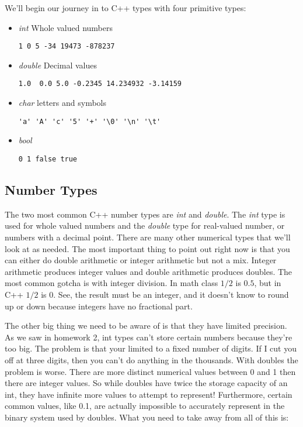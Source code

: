 \documentclass[]{tufte-handout}
\begin{document}
We'll begin our journey in to C++ types with four primitive types:
\begin{itemize}
\item \textit{int} Whole valued numbers
\begin{verbatim}
1 0 5 -34 19473 -878237
\end{verbatim}
\item \textit{double} Decimal values
\begin{verbatim}
1.0  0.0 5.0 -0.2345 14.234932 -3.14159
\end{verbatim}
\item \textit{char} letters and symbols
\begin{verbatim}
'a' 'A' 'c' '5' '+' '\0' '\n' '\t'
\end{verbatim}
\item \textit{bool}
\begin{verbatim}
0 1 false true
\end{verbatim}
\end{itemize}

\subsection{Number Types}

The two most common C++ number types are \textit{int} and \textit{double}. The \textit{int} type is used for whole valued numbers and the \textit{double} type for real-valued number, or numbers with a decimal point. There are many other numerical types that we'll look at as needed. The most important thing to point out right now is that you can either do double arithmetic or integer arithmetic but not a mix.  Integer arithmetic produces integer values and double arithmetic produces doubles. The most common gotcha is with integer division.  In math class $1/2$ is $0.5$, but in C++ $1/2$ is $0$.  See, the result must be an integer, and it doesn't know to round up or down because integers have no fractional part.  

The other big thing we need to be aware of is that they have limited precision. As we saw in homework 2, int types can't store certain numbers because they're too big.  The problem is that your limited to a fixed number of digits. If I cut you off at three digits, then you can't do anything in the thousands.  With doubles the problem is worse. There are more distinct numerical values between 0 and 1 then there are integer values. So while doubles have twice the storage capacity of an int, they have infinite more values to attempt to represent! Furthermore, certain common values, like 0.1, are actually impossible to accurately represent in the binary system used by doubles.  What you need to take away from all of this is:
\end{document}
